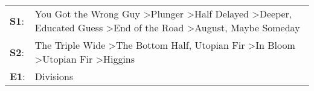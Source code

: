 \begin{supertabular}{p{0.03\textwidth}p{0.92\textwidth}}
 \textbf{S1}:  &  You Got the Wrong Guy\textsuperscript{} \textgreater \enspace Plunger\textsuperscript{} \textgreater \enspace Half Delayed\textsuperscript{} \textgreater \enspace Deeper\textsuperscript{}, \enspace Educated Guess\textsuperscript{} \textgreater \enspace End of the Road\textsuperscript{} \textgreater \enspace August\textsuperscript{}, \enspace Maybe Someday\textsuperscript{}  \enspace  \\
 \textbf{S2}:  &                                                                                                   The Triple Wide\textsuperscript{} \textgreater \enspace The Bottom Half\textsuperscript{}, \enspace Utopian Fir\textsuperscript{} \textgreater \enspace In Bloom\textsuperscript{} \textgreater \enspace Utopian Fir\textsuperscript{} \textgreater \enspace Higgins\textsuperscript{}  \enspace  \\
 \textbf{E1}:  &                                                                                                                                                                                                                                                                                                                                                              Divisions\textsuperscript{}  \enspace  \\
\end{supertabular}

